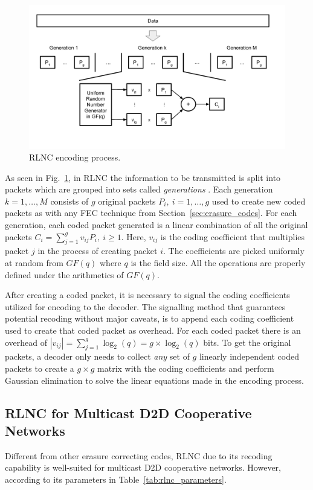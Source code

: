 \begin{figure}[h]
  \centering
  \includegraphics[width=\textwidth]{introduction/figures/RLNC.pdf}
  \caption{RLNC encoding process.}
\label{fig:rlnc_enc}
\end{figure}

As seen in Fig.~\ref{fig:rlnc_enc}, in \ac{RLNC} the information to be transmitted is split into packets which are grouped into sets called \textit{generations} \cite{chou2003practical}. Each generation $k = 1, \ldots, M$ consists of $g$ original packets $P_i,\ i = 1, \ldots, g$ used to create new coded packets as with any \ac{FEC} technique from Section~\ref{sec:erasure_codes}. For each generation, each coded packet generated is a linear combination of all the original packets $C_i = \sum_{j = 1}^g v_{ij} P_i,\ i \geq 1$. Here, $v_{ij}$ is the coding coefficient that multiplies packet $j$ in the process of creating packet $i$. The coefficients are picked uniformly at random from $GF(q)$ where $q$ is the field size. All the operations are properly defined under the arithmetics of $GF(q)$.

After creating a coded packet, it is necessary to signal the coding coefficients utilized for encoding to the decoder. The signalling method that guarantees potential recoding without major caveats, is to append each coding coefficient used to create that coded packet as overhead. For each coded packet there is an overhead of $|v_{ij}| = \sum_{j = 1}^g \log_{2}(q) = g \times \log_{2}(q)$ bits. To get the original packets, a decoder only needs to collect \textit{any} set of $g$ linearly independent coded packets to create a $g \times g$ matrix with the coding coefficients and perform Gaussian elimination \cite{fragouli2006network} to solve the linear equations made in the encoding process.

\subsection{RLNC for Multicast D2D Cooperative Networks}
Different from other erasure correcting codes, \ac{RLNC} due to its recoding capability is well-suited for multicast \ac{D2D} cooperative networks. However, according to its parameters in Table~\ref{tab:rlnc_parameters}.

